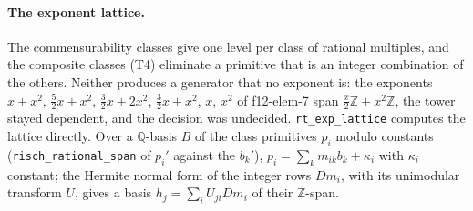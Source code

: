 \documentclass[11pt]{article}
\theoremstyle{definition}
\theoremstyle{remark}
\newcommand{\Q}{\mathbb{Q}}
\newcommand{\Z}{\mathbb{Z}}
\newcommand{\code}[1]{\texttt{#1}}
\begin{document}
\paragraph{The exponent lattice.} The commensurability classes give one level per class of
rational multiples, and the composite classes (T4) eliminate a primitive that is an integer
combination of the others. Neither produces a generator that no exponent is: the exponents
$x+x^2$, $\frac52x+x^2$, $\frac32x+2x^2$, $\frac32x+x^2$, $x$, $x^2$ of f12-elem-7 span
$\frac x2\Z+x^2\Z$, the tower stayed dependent, and the decision was undecided.
\code{rt\_exp\_lattice} computes the lattice directly. Over a $\Q$-basis $B$ of the class
primitives $p_i$ modulo constants (\code{risch\_rational\_span} of $p_i'$ against the $b_k'$),
$p_i=\sum_km_{ik}b_k+\kappa_i$ with $\kappa_i$ constant; the Hermite normal form of the integer rows $Dm_i$, with its
unimodular transform $U$, gives a basis $h_j=\sum_iU_{ji}Dm_i$ of their $\Z$-span.
\end{document}

